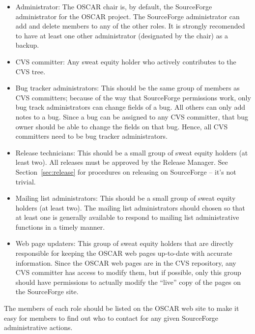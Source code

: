\begin{itemize}
\item Administrator: The OSCAR chair is, by default, the SourceForge
  administrator for the OSCAR project.  The SourceForge administrator
  can add and delete members to any of the other roles.  It is
  strongly recomended to have at least one other administrator
  (designated by the chair) as a backup.

\item CVS committer: Any sweat equity holder who actively contributes
  to the CVS tree.
  
\item Bug tracker administrators: This should be the same group of
  members as CVS committers; because of the way that SourceForge
  permissions work, only bug track administrators can change fields of
  a bug.  All others can only add notes to a bug.  Since a bug can be
  assigned to any CVS committer, that bug owner should be able to
  change the fields on that bug.  Hence, all CVS committers need to be
  bug tracker administrators.
  
\item Release technicians: This should be a small group of sweat
  equity holders (at least two).  All releases must be approved by the
  Release Manager.  See Section~\ref{sec:release} for procedures on
  releasing on SourceForge -- it's not trivial.

\item Mailing list administrators: This should be a small group of
  sweat equity holders (at least two).  The mailing list
  administrators should chosen so that at least one is generally
  available to respond to mailing list administrative functions in a
  timely manner.
  
\item Web page updaters: This group of sweat equity holders that are
  directly responsible for keeping the OSCAR web pages up-to-date with
  accurate information.  Since the OSCAR web pages are in the CVS
  repository, any CVS committer has access to modify them, but if
  possible, only this group should have permissions to actually modify
  the ``live'' copy of the pages on the SourceForge site.
\end{itemize}

The members of each role should be listed on the OSCAR web site to
make it easy for members to find out who to contact for any given
SourceForge administrative actions.

